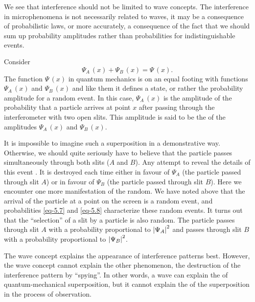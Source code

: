We see that interference should not be limited to wave concepts. The
interference in microphenomena is not necessarily related to waves, it
may be a consequence of probabilistic laws, or more accurately,
a consequence of the fact that we should sum up probability amplitudes
rather than probabilities for indistinguishable events.

 Consider
\begin{equation}%
 \Psi_{A} \, (x) +  \Psi_{B} \, (x)= \Psi \, (x).
\label{eq-5.10}
\end{equation}
The function $\Psi \, (x) $ in quantum mechanics is on an equal footing with
functions $ \Psi_{A} \, (x)$ and $ \Psi_{B} \, (x)$ and like them it defines a state, or rather the probability amplitude for a random event. In this case, $ \Psi_{A} \, (x)$ is the amplitude of the probability that a particle arrives at point $x$ after passing through the interferometer with two open slits. This amplitude is said to be the  of the amplitudes $ \Psi_{A} \, (x)$ and $ \Psi_{B} \, (x)$.


It is impossible to imagine such a superposition in a demonstrative
way. Otherwise, we should quite seriously have to believe that the
particle passes simultaneously through both slits ($A$ and $B$). Any attempt
to reveal the details of this event . It is
destroyed each time either in favour of $ \Psi_{A}$ (the particle passed through slit $A$) or in favour of $ \Psi_{B} $ (the particle passed through slit $B$). Here we encounter one more manifestation of the random. We have
noted above that the arrival of the particle at a point on the screen is
a random event, and probabilities \eqref{eq-5.7} and \eqref{eq-5.8} characterize these random events. It turns out that the ``selection'' of a slit by a particle is also random. The particle passes through slit $A$ with a probability proportional to  $ \abs{\Psi_{A}}^{2}$ and passes through slit $B$ with a probability proportional to $ \abs{\Psi_{B}}^{2}$.

 The wave concept
explains the appearance of interference patterns best. However, the wave
concept cannot explain the other phenomenon, the destruction of the
interference pattern by ``spying''. In other words, a wave can explain the
 of quantum-mechanical superposition, but it cannot explain the  of the superposition in the process of observation.

